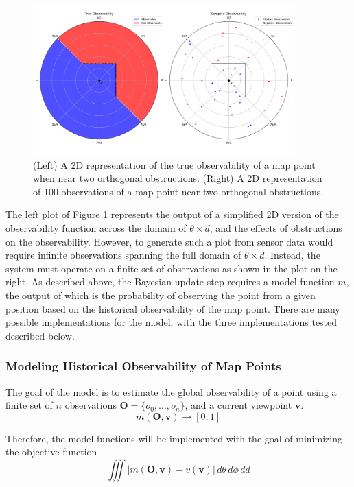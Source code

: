 \begin{figure}[!ht]
    \centering
    \includegraphics[width=0.9\textwidth]{resources/2d_observability.png}
    \caption[2D Observability]{(Left) A 2D representation of the true observability of a map point when near two orthogonal obstructions. (Right) A 2D representation of 100 observations of a map point near two orthogonal obstructions.}
    \label{fig:2d_observability}
\end{figure}

The left plot of Figure \ref{fig:2d_observability} represents the output of a simplified 2D version of the observability function across the domain of $\theta\times d$, and the effects of obstructions on the observability. However, to generate such a plot from sensor data would require infinite observations spanning the full domain of $\theta\times d$. Instead, the system must operate on a finite set of observations as shown in the plot on the right. As described above, the Bayesian update step requires a model function $m$, the output of which is the probability of observing the point from a given position based on the historical observability of the map point. There are many possible implementations for the model, with the three implementations tested described below.

\subsubsection{Modeling Historical Observability of Map Points}

The goal of the model is to estimate the global observability of a point using a finite set of $n$ observations $\boldsymbol{O} = \{o_0,\dots,o_n\}$, and a current viewpoint $\boldsymbol{v}$.
$$
    m(\boldsymbol{O},\boldsymbol{v})\to[0,1]
$$

Therefore, the model functions will be implemented with the goal of minimizing the objective function
$$
    \iiint |m(\boldsymbol{O},\boldsymbol{v}) - v(\boldsymbol{v})| \,d\theta\,d\phi\,dd
$$

